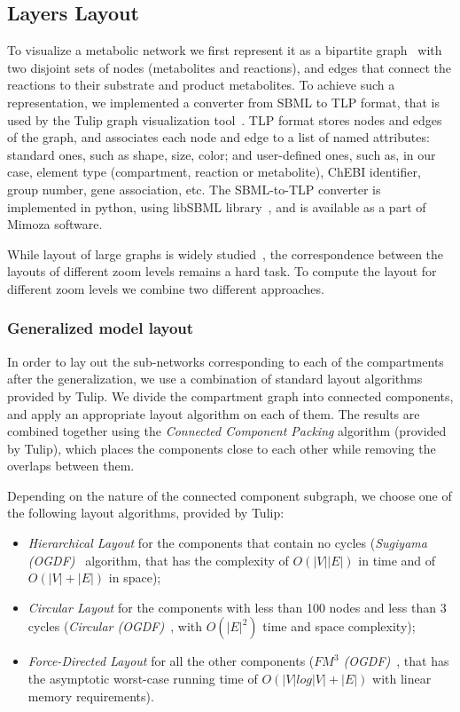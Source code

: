 \documentclass{bmcart}
\begin{document}
\subsection*{Layers Layout}
To visualize a metabolic network we first represent it as a bipartite graph~\cite{Diestel2012} with two disjoint sets of nodes (metabolites and reactions), and edges that connect the reactions to their substrate and product metabolites. To achieve such a representation, we implemented a converter from SBML to TLP format, that is used by the Tulip graph visualization tool~\cite{Auber04}. TLP format stores nodes and edges of the graph, and associates each node and edge to a list of named attributes: standard ones, such as shape, size, color; and user-defined ones, such as, in our case, element type (compartment, reaction or metabolite), ChEBI identifier, group number, gene association, etc. The SBML-to-TLP converter is implemented in python, using libSBML library~\cite{Bornstein2008}, and is available as a part of Mimoza software. 

While layout of large graphs is widely studied~\cite{Unwin2006}, the correspondence between the layouts of different zoom levels remains a hard task. To compute the layout for different zoom levels we combine two different approaches.

\subsubsection*{Generalized model layout}
In order to lay out the sub-networks corresponding to each of the compartments after the generalization, we use a combination of standard layout algorithms provided by Tulip. We divide the compartment graph into connected components, and apply an appropriate layout algorithm on each of them. The results are combined together using the \emph{Connected Component Packing} algorithm (provided by Tulip), which places the components close to each other while removing the overlaps between them.

Depending on the nature of the connected component subgraph, we choose one of the following layout algorithms, provided by Tulip:
\begin{itemize}
\item \emph{Hierarchical Layout} for the components that contain no cycles (\emph{Sugiyama (OGDF)}~\cite{Sugiyama1981} algorithm, that has the complexity of $O(|V||E|)$ in time and of $O(|V| + |E|)$ in space);
\item \emph{Circular Layout} for the components with less than 100 nodes and less than 3 cycles (\emph{Circular (OGDF)}~\cite{Tamassia:2007:HGD:1202383}, with $O(|E|^2)$ time and space complexity);
\item \emph{Force-Directed Layout} for all the other components (\emph{$FM^3$ (OGDF)}~\cite{Hachul2005}, that has the asymptotic worst-case running time of $O(|V|log|V|+|E|)$ with linear memory requirements).
\end{itemize}
\end{document}
